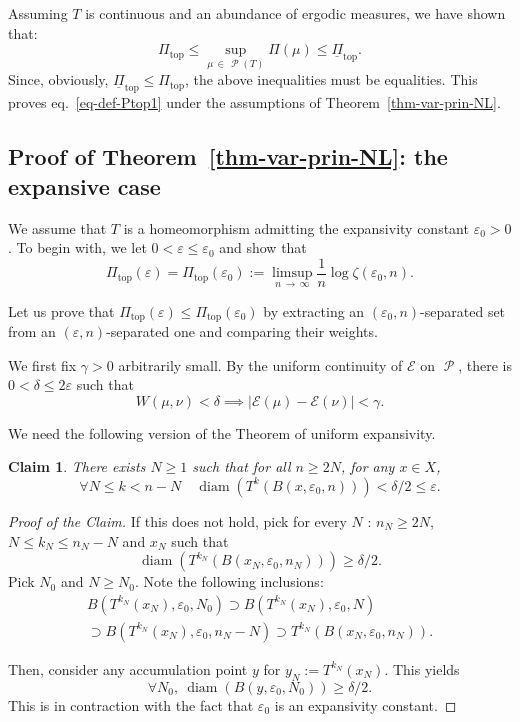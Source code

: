 \documentclass[AHL, Unicode, longabstracts,published]{cedram}
\theoremstyle{plain}
\theoremstyle{plain}
\newtheorem{claim}{Claim}
\newcommand\eps{\varepsilon}
\newcommand\NLP{\Pi}
\renewcommand\top{{\mathrm{top}}}
\newcommand{\diam}{\operatorname{diam}}
\newcommand\Prob{{\operatorname{\mathscr{P}}}}
\newcommand*\8{\infty}
\newcommand{\En}{\mathcal{E}}
\let\oldforall\forall
\renewcommand*{\forall}{\mathrel{\oldforall}}
\begin{document}
Assuming $T$ is continuous and an abundance of ergodic measures, we have shown that:
\[
\NLP_\top \le \sup_{\mu\,\in\,\Prob(T)} \NLP(\mu) \leq \underline{\NLP}_\top.
\]
Since, obviously, $\underline{\NLP}_\top \le \NLP_\top$, the above inequalities must be equalities. This proves eq.~\eqref{eq-def-Ptop1} under the assumptions of Theorem~\ref{thm-var-prin-NL}.


\subsection{Proof of Theorem~\ref{thm-var-prin-NL}: the expansive case}\label{sec-Th-A-expansive}

We assume that $T$ is a homeomorphism admitting the expansivity constant $\eps_0>0$. To begin with, we let $0<\eps\le\eps_0$ and show that
\begin{equation}\label{eq-Ptop-exp0}
\NLP_\top(\eps)=\NLP_\top(\eps_0):=\limsup_{n\,\to\,\infty} \frac1n\log\zeta(\eps_0,n).
\end{equation}

Let us prove that $\NLP_\top(\eps)\leq\NLP_\top(\eps_0)$ by extracting an $(\eps_0,n)$-separated set from an $(\eps,n)$-separated one and comparing their weights.

We first fix $\gamma>0$ arbitrarily small. By the uniform continuity of $\En$ on $\Prob$, there is $0<\delta \leq2\eps$ such that
\begin{equation}\label{eq-ECU}
W(\mu,\nu)<\delta\implies \lvert \En(\mu)-\En(\nu) \rvert<\gamma.
\end{equation}

We need the following version of the Theorem of uniform expansivity.
\begin{claim}
There exists $N\geq1$ such that for all $n\geq 2N$, for any $x\in X$,
\begin{equation}\label{eq-expansivity}
\forall N\leq k<n-N\quad \diam\left(T^k(B(x,\eps_0,n))\right)<\delta/2 \leq\eps.
\end{equation}
\end{claim}

\begin{proof}[Proof of the Claim]
If this does not hold, pick for every $N$ : $n_{N}\ge 2N$, $N\le k_{N}\le n_{N}-N$ and $x_{N}$ such that
\[
\diam\left(T^{k_{N}}(B(x_{N},\eps_{0},n_{N}))\right)\ge \delta/2.
\]
Pick $N_{0}$ and $N\ge N_{0}$. Note the following inclusions:
\begin{multline*}
B\left(T^{k_{N}}(x_{N}),\eps_{0}, N_{0}\right)\supset B\left(T^{k_{N}}(x_{N}),\eps_{0}, N\right)\\
\supset B\left(T^{k_{N}}(x_{N}),\eps_{0}, n_{N}-N\right)\supset T^{k_{N}}(B(x_{N},\eps_{0},n_{N})).
\end{multline*}


Then, consider any accumulation point $y$ for $y_{N}:=T^{k_{N}}(x_{N})$. This yields
\[
\forall N_{0},\ \diam(B(y,\eps_{0},N_{0}))\ge \delta/2.
\]
This is in contraction with the fact that $\eps_{0}$ is an expansivity constant.
\end{proof}
\end{document}
